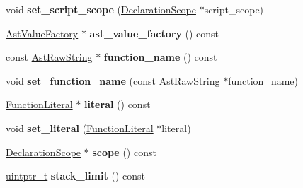 \begin{DoxyCompactItemize}
\item 
\mbox{\label{classv8_1_1internal_1_1ParseInfo_aea4fa50bd6a64a3af9bbe05581d37106}} 
void {\bfseries set\+\_\+script\+\_\+scope} (\mbox{\hyperlink{classv8_1_1internal_1_1DeclarationScope}{Declaration\+Scope}} $\ast$script\+\_\+scope)
\item 
\mbox{\label{classv8_1_1internal_1_1ParseInfo_a822b903695e435c2b91c8bffa3deabec}} 
\mbox{\hyperlink{classv8_1_1internal_1_1AstValueFactory}{Ast\+Value\+Factory}} $\ast$ {\bfseries ast\+\_\+value\+\_\+factory} () const
\item 
\mbox{\label{classv8_1_1internal_1_1ParseInfo_a8e8b4a76bdaff5c93de5c0f0e97a09b2}} 
const \mbox{\hyperlink{classv8_1_1internal_1_1AstRawString}{Ast\+Raw\+String}} $\ast$ {\bfseries function\+\_\+name} () const
\item 
\mbox{\label{classv8_1_1internal_1_1ParseInfo_a311d865b988055b61675e59da73335da}} 
void {\bfseries set\+\_\+function\+\_\+name} (const \mbox{\hyperlink{classv8_1_1internal_1_1AstRawString}{Ast\+Raw\+String}} $\ast$function\+\_\+name)
\item 
\mbox{\label{classv8_1_1internal_1_1ParseInfo_a3daf137033c6004dfaae4efd80ea9dac}} 
\mbox{\hyperlink{classv8_1_1internal_1_1FunctionLiteral}{Function\+Literal}} $\ast$ {\bfseries literal} () const
\item 
\mbox{\label{classv8_1_1internal_1_1ParseInfo_aefb7ee3ef914dcec6fd750426e3885ce}} 
void {\bfseries set\+\_\+literal} (\mbox{\hyperlink{classv8_1_1internal_1_1FunctionLiteral}{Function\+Literal}} $\ast$literal)
\item 
\mbox{\label{classv8_1_1internal_1_1ParseInfo_a98f5bb1bd7c14ee34f31f4b92afa751c}} 
\mbox{\hyperlink{classv8_1_1internal_1_1DeclarationScope}{Declaration\+Scope}} $\ast$ {\bfseries scope} () const
\item 
\mbox{\label{classv8_1_1internal_1_1ParseInfo_ab8d8dad355525fa07adebbeb43245010}} 
\mbox{\hyperlink{classuintptr__t}{uintptr\+\_\+t}} {\bfseries stack\+\_\+limit} () const

\end{DoxyCompactItemize}
